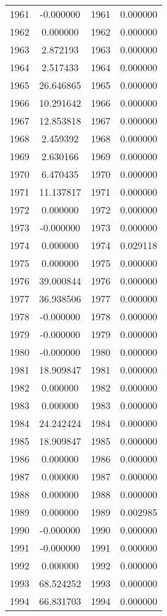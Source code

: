 \documentclass[12pt]{article}
\begin{document}
\begin{longtable}{@{}cccc@{}}
1961 & -0.000000 & 1961 & 0.000000 \\
1962 & 0.000000 & 1962 & 0.000000 \\
1963 & 2.872193 & 1963 & 0.000000 \\
1964 & 2.517433 & 1964 & 0.000000 \\
1965 & 26.646865 & 1965 & 0.000000 \\
1966 & 10.291642 & 1966 & 0.000000 \\
1967 & 12.853818 & 1967 & 0.000000 \\
1968 & 2.459392 & 1968 & 0.000000 \\
1969 & 2.630166 & 1969 & 0.000000 \\
1970 & 6.470435 & 1970 & 0.000000 \\
1971 & 11.137817 & 1971 & 0.000000 \\
1972 & 0.000000 & 1972 & 0.000000 \\
1973 & -0.000000 & 1973 & 0.000000 \\
1974 & 0.000000 & 1974 & 0.029118 \\
1975 & 0.000000 & 1975 & 0.000000 \\
1976 & 39.000844 & 1976 & 0.000000 \\
1977 & 36.938506 & 1977 & 0.000000 \\
1978 & -0.000000 & 1978 & 0.000000 \\
1979 & -0.000000 & 1979 & 0.000000 \\
1980 & -0.000000 & 1980 & 0.000000 \\
1981 & 18.909847 & 1981 & 0.000000 \\
1982 & 0.000000 & 1982 & 0.000000 \\
1983 & 0.000000 & 1983 & 0.000000 \\
1984 & 24.242424 & 1984 & 0.000000 \\
1985 & 18.909847 & 1985 & 0.000000 \\
1986 & 0.000000 & 1986 & 0.000000 \\
1987 & 0.000000 & 1987 & 0.000000 \\
1988 & 0.000000 & 1988 & 0.000000 \\
1989 & 0.000000 & 1989 & 0.002985 \\
1990 & -0.000000 & 1990 & 0.000000 \\
1991 & -0.000000 & 1991 & 0.000000 \\
1992 & 0.000000 & 1992 & 0.000000 \\
1993 & 68.524252 & 1993 & 0.000000 \\
1994 & 66.831703 & 1994 & 0.000000 \\

\end{longtable}
\end{document}

